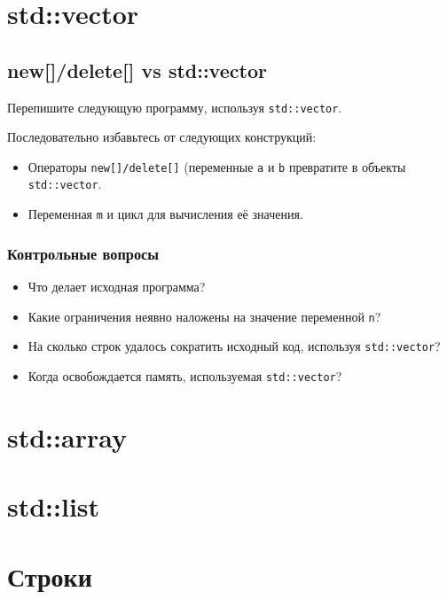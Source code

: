 \documentclass[10pt,twoside,openany]{book}
\begin{document}



\tableofcontents

\clearpage

\chapter{std::vector}

\section{new[]/delete[] vs std::vector}

Перепишите следующую программу, используя {\tt std::vector}.

Последовательно избавьтесь от следующих конструкций:
\begin{itemize}
    \item Операторы {\tt new[]/delete[]} (переменные {\tt a} и {\tt b}
          превратите в объекты {\tt std::vector}.
    \item Переменная {\tt m} и цикл для вычисления её значения.
\end{itemize}



\subsection*{Контрольные вопросы}

\begin{itemize}
    \item Что делает исходная программа?
    \item Какие ограничения неявно наложены на значение переменной {\tt n}?
    \item На сколько строк удалось сократить исходный код, используя {\tt std::vector}?
    \item Когда освобождается память, используемая {\tt std::vector}?
\end{itemize}

\chapter{std::array}

\chapter{std::list}

\chapter{Строки}
\end{document}
